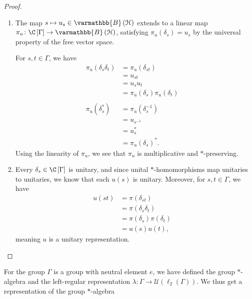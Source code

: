 \documentclass[10pt]{mypackage}
\renewcommand*{\mathbb}[1]{\varmathbb{#1}}
\newcommand{\B}{\mathbb{B}}
\begin{document}
\begin{proof}\hfill
  \begin{enumerate}[(1)]
    \item The map $s\mapsto u_s\in \B\left(\mathcal{H}\right)$ extends to a linear map $\pi_u\colon \C\left[\Gamma\right]\rightarrow \B\left(\mathcal{H}\right)$, satisfying $\pi_u\left(\delta_s\right) = u_s$ by the universal property of the free vector space.\newline

      For $s,t\in \Gamma$, we have
      \begin{align*}
        \pi_u\left(\delta_s\delta_t\right) &= \pi_u\left(\delta_{st}\right)\\
                                           &= u_{st}\\
                                           &= u_su_t\\
                                           &= \pi_u\left(\delta_s\right)\pi_u\left(\delta_t\right)\\
                                           \\
        \pi_u\left(\delta_s^{\ast}\right) &= \pi_u\left(\delta_{s}^{-1}\right)\\
                                          &= u_{s^{-1}}\\
                                          &= u_{s}^{\ast}\\
                                          &= \pi_u\left(\delta_s\right)^{\ast}.
      \end{align*}
      Using the linearity of $\pi_u$, we see that $\pi_u$ is multiplicative and $\ast$-preserving.
    \item Every $\delta_s\in \C\left[\Gamma\right]$ is unitary, and since unital $\ast$-homomorphisms map unitaries to unitaries, we know that each $u(s)$ is unitary. Moreover, for $s,t\in \Gamma$, we have
      \begin{align*}
        u\left(st\right) &= \pi\left(\delta_{st}\right)\\
                         &= \pi\left(\delta_s\delta_t\right)\\
                         &= \pi\left(\delta_s\right)\pi\left(\delta_t\right)\\
                         &= u(s)u(t),
      \end{align*}
      meaning $u$ is a unitary representation.
  \end{enumerate}
\end{proof}
For the group $\Gamma$ is a group with neutral element $e$, we have defined the group $\ast$-algebra and the left-regular representation $\lambda\colon \Gamma\rightarrow \mathcal{U}\left(\ell_2\left(\Gamma\right)\right)$. We thus get a representation of the group $\ast$-algebra
\end{document}
